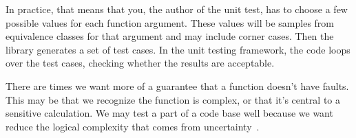 
\vskip 6pt
In practice, that means that you, the author of the unit test, has to choose a few possible values for each function argument. These values will be samples from equivalence classes for that argument and may include corner cases. Then the \utd library generates a set of test cases. In the unit testing framework, the code loops over the test cases, checking whether the results are acceptable.

 There are times we want more of a guarantee that a function doesn't have faults. This may be that we recognize the function is complex, or that it's central to a sensitive calculation. We may test a part of a code base well because we want reduce the logical complexity that comes from uncertainty~\cite{Sha2001-ie}.